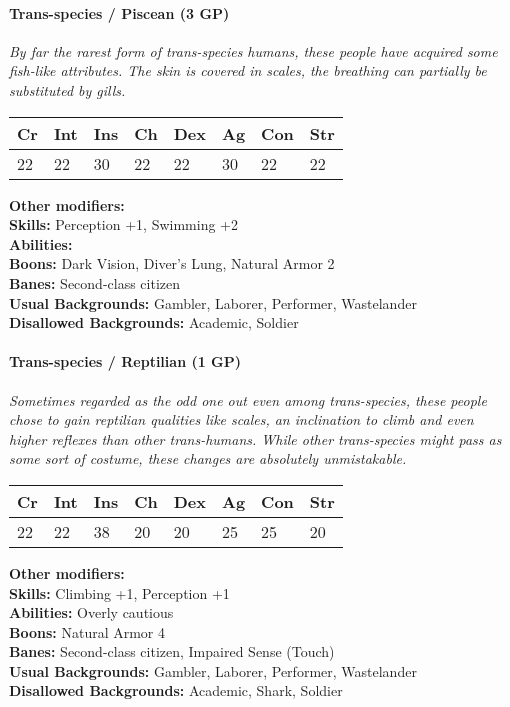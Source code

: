 \hrulefill
\paragraph*{Trans-species / Piscean (3 GP)}
\textit{By far the rarest form of trans-species humans, these people have acquired some fish-like attributes. The skin is covered in scales, the breathing can partially be substituted by gills.}\par
\begin{tabular}{|l|l|l|l|l|l|l|l|}
	\hline
	Cr & Int & Ins & Ch & Dex & Ag & Con & Str \\ \hline
	22 & 22 & 30 & 22 & 22 & 30 & 22 & 22 \\ \hline
\end{tabular}\par
\noindent\textbf{Other modifiers:} \\
\textbf{Skills:} Perception +1, Swimming +2\\
\textbf{Abilities:} \\
\textbf{Boons:} Dark Vision, Diver's Lung, Natural Armor 2\\
\textbf{Banes:} Second-class citizen\\
\textbf{Usual Backgrounds:} Gambler, Laborer, Performer, Wastelander\\
\textbf{Disallowed Backgrounds:} Academic, Soldier

\hrulefill
\paragraph*{Trans-species / Reptilian (1 GP)}
\textit{Sometimes regarded as the odd one out even among trans-species, these people chose to gain reptilian qualities like scales, an inclination to climb and even higher reflexes than other trans-humans.
	While other trans-species might pass as some sort of costume, these changes are absolutely unmistakable.}\par
\begin{tabular}{|l|l|l|l|l|l|l|l|}
	\hline
	Cr & Int & Ins & Ch & Dex & Ag & Con & Str \\ \hline
	22 & 22 & 38 & 20 & 20 & 25 & 25 & 20 \\ \hline
\end{tabular}\par
\noindent\textbf{Other modifiers:} \\
\textbf{Skills:} Climbing +1, Perception +1\\
\textbf{Abilities:} Overly cautious\\
\textbf{Boons:} Natural Armor 4\\
\textbf{Banes:} Second-class citizen, Impaired Sense (Touch)\\
\textbf{Usual Backgrounds:} Gambler, Laborer, Performer, Wastelander\\
\textbf{Disallowed Backgrounds:} Academic, Shark, Soldier

